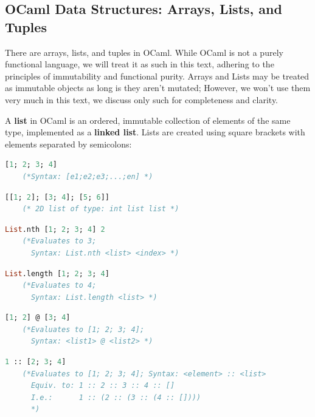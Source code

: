 \newpage

\subsection{OCaml Data Structures: Arrays, Lists, and Tuples}

There are arrays, lists, and tuples in OCaml. While OCaml is not a purely functional language, we will treat it as such in this text, adhering to the principles of immutability and functional purity.
Arrays and Lists may be treated as immutable objects as long is they aren't mutated; However, we won't use them very much in this text, we discuss only such for completeness and clarity.

\begin{Def}

    A \textbf{list} in OCaml is an ordered, immutable collection of elements of the same type, 
    implemented as a \textbf{linked list}. Lists are created using square brackets \snippet{[ ]} 
    with elements separated by semicolons:
    \begin{lstlisting}[language=OCaml, caption={Defining a List}, numbers=none]
    [1; 2; 3; 4]
    (*Syntax: [e1;e2;e3;...;en] *)
    \end{lstlisting}

    \begin{lstlisting}[language=OCaml, caption={List of Lists}, numbers=none]
    [[1; 2]; [3; 4]; [5; 6]]
    (* 2D list of type: int list list *)   
    \end{lstlisting}

    \begin{lstlisting}[language=OCaml, caption={Indexing a List}, numbers=none]
    List.nth [1; 2; 3; 4] 2
    (*Evaluates to 3; 
      Syntax: List.nth <list> <index> *)
    \end{lstlisting}

    \begin{lstlisting}[language=OCaml, caption={Finding Length}, numbers=none]
    List.length [1; 2; 3; 4]
    (*Evaluates to 4; 
      Syntax: List.length <list> *)
    \end{lstlisting}

    \begin{lstlisting}[language=OCaml, caption={Joining Lists}, numbers=none]
    [1; 2] @ [3; 4]
    (*Evaluates to [1; 2; 3; 4]; 
      Syntax: <list1> @ <list2> *)
    \end{lstlisting}

    \begin{lstlisting}[language=OCaml, caption={Cons Operator (::) Appending One Head Element}, numbers=none]
    1 :: [2; 3; 4]
    (*Evaluates to [1; 2; 3; 4]; Syntax: <element> :: <list> 
      Equiv. to: 1 :: 2 :: 3 :: 4 :: []
      I.e.:      1 :: (2 :: (3 :: (4 :: [])))
      *)
    \end{lstlisting}
\end{Def}

